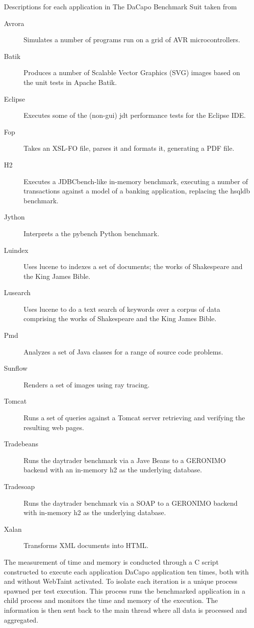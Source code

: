 \begin{table}[H]
  \centering
  \caption{Descriptions for each application in The DaCapo Benchmark Suit taken from \textcite{dacapoBench}}
    \label{table:DaCapoTests}
    \begin{description}
        \item [Avrora] Simulates a number of programs run on a grid of AVR microcontrollers.
        \item [Batik] Produces a number of Scalable Vector Graphics (SVG) images based on the unit tests in Apache Batik.
        \item [Eclipse] Executes some of the (non-gui) jdt performance tests for the Eclipse IDE.
        \item [Fop] Takes an XSL-FO file, parses it and formats it, generating a PDF file.
        \item [H2] Executes a JDBCbench-like in-memory benchmark, executing a number of transactions against a model of a banking application, replacing the hsqldb benchmark.
        \item [Jython] Interprets a the pybench Python benchmark.
        \item [Luindex] Uses lucene to indexes a set of documents; the works of Shakespeare and the King James Bible.
        \item [Lusearch] Uses lucene to do a text search of keywords over a corpus of data comprising the works of Shakespeare and the King James Bible.
        \item [Pmd] Analyzes a set of Java classes for a range of source code problems.
        \item [Sunflow] Renders a set of images using ray tracing.
        \item [Tomcat] Runs a set of queries against a Tomcat server retrieving and verifying the resulting web pages.
        \item [Tradebeans] Runs the daytrader benchmark via a Jave Beans to a GERONIMO backend with an in-memory h2 as the underlying database.
        \item [Tradesoap] Runs the daytrader benchmark via a SOAP to a GERONIMO backend with in-memory h2 as the underlying database.
        \item [Xalan] Transforms XML documents into HTML.
    \end{description}
\end{table}

The measurement of time and memory is conducted through a C script constructed to execute each application DaCapo application ten times, both with and without WebTaint activated. To isolate each iteration is a unique process spawned per test execution. This process runs the benchmarked application in a child process and monitors the time and memory of the execution. The information is then sent back to the main thread where all data is processed and aggregated.  
